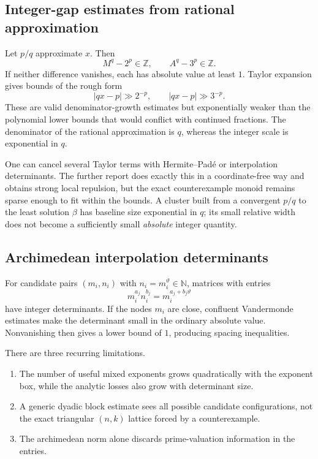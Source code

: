 \documentclass[11pt,oneside]{article}
\theoremstyle{definition}
\theoremstyle{remark}
\newcommand{\N}{\mathbb N}
\newcommand{\Z}{\mathbb Z}
\begin{document}
\subsection{Integer-gap estimates from rational approximation}

Let $p/q$ approximate $x$.  Then
\[
 M^q-2^p\in\Z,
 \qquad
 A^q-3^p\in\Z.
\]
If neither difference vanishes, each has absolute value at least $1$.  Taylor expansion gives
bounds of the rough form
\[
  |qx-p|\gg 2^{-p},
  \qquad
  |qx-p|\gg 3^{-p}.
\]
These are valid denominator-growth estimates but exponentially weaker than the polynomial
lower bounds that would conflict with continued fractions.  The denominator of the rational
approximation is $q$, whereas the integer scale is exponential in $q$.

One can cancel several Taylor terms with Hermite--Pad\'e or interpolation determinants.  The
further report does exactly this in a coordinate-free way and obtains strong local repulsion,
but the exact counterexample monoid remains sparse enough to fit within the bounds.  A cluster
built from a convergent $p/q$ to the least solution $\beta$ has baseline size exponential in
$q$; its small relative width does not become a sufficiently small \emph{absolute} integer
quantity.

\subsection{Archimedean interpolation determinants}

For candidate pairs $(m_i,n_i)$ with $n_i=m_i^{\vartheta}\in\N$, matrices with entries
\[
  m_i^{a_j}n_i^{b_j}=m_i^{a_j+b_j\vartheta}
\]
have integer determinants.  If the nodes $m_i$ are close, confluent Vandermonde estimates make
the determinant small in the ordinary absolute value.  Nonvanishing then gives a lower bound
of $1$, producing spacing inequalities.

There are three recurring limitations.

\begin{enumerate}
\item The number of useful mixed exponents grows quadratically with the exponent box, while
      the analytic losses also grow with determinant size.
\item A generic dyadic block estimate sees all possible candidate configurations, not the
      exact triangular $(n,k)$ lattice forced by a counterexample.
\item The archimedean norm alone discards prime-valuation information in the entries.
\end{enumerate}
\end{document}
